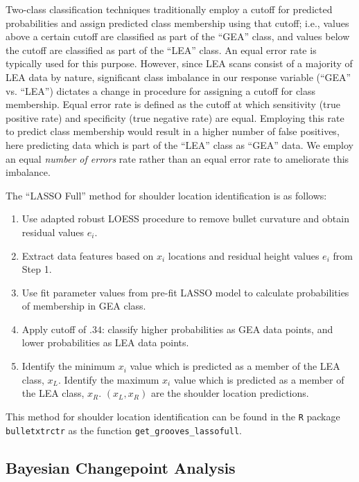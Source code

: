 \documentclass[12pt]{article}
\begin{document}
Two-class classification techniques traditionally employ a cutoff for
predicted probabilities and assign predicted class membership using that
cutoff; i.e., values above a certain cutoff are classified as part of
the ``GEA'' class, and values below the cutoff are classified as part of
the ``LEA'' class. An equal error rate is typically used for this
purpose. However, since LEA scans consist of a majority of LEA data by
nature, significant class imbalance in our response variable (``GEA''
vs. ``LEA'') dictates a change in procedure for assigning a cutoff for
class membership. Equal error rate is defined as the cutoff at which
sensitivity (true positive rate) and specificity (true negative rate)
are equal. Employing this rate to predict class membership would result
in a higher number of false positives, here predicting data which is
part of the ``LEA'' class as ``GEA'' data. We employ an equal
\textit{number of errors} rate rather than an equal error rate to
ameliorate this imbalance.

The ``LASSO Full'' method for shoulder location identification is as
follows:

\begin{enumerate}
\item Use adapted robust LOESS procedure to remove bullet curvature and obtain residual values $e_i$.
\item Extract data features based on $x_i$ locations and residual height values $e_i$ from Step 1. 
\item Use fit parameter values from pre-fit LASSO model to calculate probabilities of membership in GEA class. 
\item Apply cutoff of $.34$: classify higher probabilities as GEA data points, and lower probabilities as LEA data points.
\item Identify the minimum $x_i$ value which is predicted as a member of the LEA class, $x_{L}$. Identify the maximum $x_i$ value which is predicted as a member of the LEA class, $x_{R}$. $(x_L, x_R)$ are the shoulder location predictions.  
\end{enumerate}

This method for shoulder location identification can be found in the
\texttt{R} package \texttt{bulletxtrctr} as the function
\texttt{get\_grooves\_lassofull}.

\subsection{Bayesian Changepoint Analysis}
\end{document}
